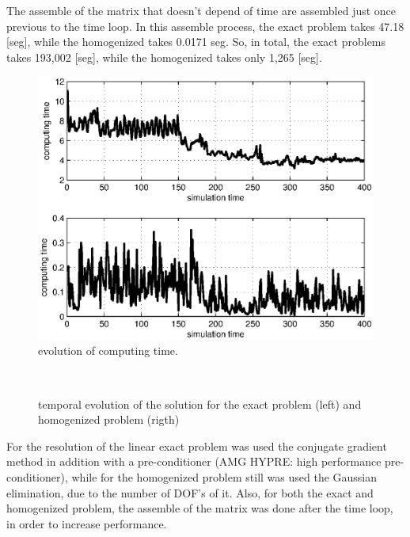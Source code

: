 The assemble of the matrix that doesn't depend of time are assembled just once previous to the time loop. In this assemble process, the exact problem takes 47.18 [seg], while the homogenized takes 0.0171 seg. So, in total, the exact problems takes 193,002 [seg], while the homogenized takes only 1,265 [seg].

\begin{figure}[H]
\centering
\includegraphics[height = 7 cm]{fig/numerical_example_MDE_exp1_benchmark}
\caption{evolution of computing time.} \label{fig:mde_ex2_benchmark}
\end{figure}

\begin{figure}[H]
\centering
{} \\
\end{figure}

\begin{figure}[H]
\centering 
{} 
\caption{temporal evolution of the solution for the exact problem (left) and homogenized problem (rigth)}\label{fig:mde_ex2}
\end{figure}


For the resolution of the linear exact problem was used the conjugate gradient method in addition with a pre-conditioner (AMG HYPRE: high performance pre-conditioner), while for the homogenized problem still was used the Gaussian elimination, due to the number of DOF's of it. Also, for both the exact and homogenized problem, the assemble of the matrix was done after the time loop, in order to increase performance.

